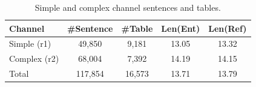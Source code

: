 \begin{table}[ht]
\center
\begin{tabular}{lcccc}
\hline
Channel & \#Sentence & \#Table & Len(Ent) & Len(Ref)\\
\hline
Simple (r1) & 49,850 & 9,181 & 13.05 & 13.32\\
Complex (r2) & 68,004 & 7,392 & 14.19 & 14.15\\
Total & 117,854 & 16,573 & 13.71 & 13.79\\
\hline
\end{tabular}
\caption{Simple and complex channel sentences and tables.}
\label{tab:tabfact_simple_complex_split}
\end{table}
